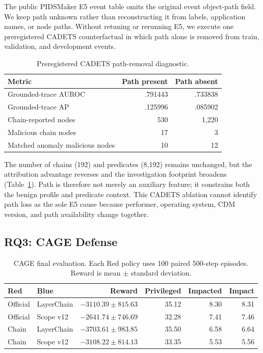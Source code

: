 \documentclass[runningheads]{llncs}
\begin{document}
The public PIDSMaker E5 event table omits the original event object-path field. We keep path unknown rather than reconstructing it from labels, application names, or node paths. Without retuning or rerunning E5, we execute one preregistered CADETS counterfactual in which path alone is removed from train, validation, and development events.

\begin{table}[t]
\caption{Preregistered CADETS path-removal diagnostic.}
\label{tab:path}
\centering
\small
\begin{tabular}{lrr}
\toprule
Metric & Path present & Path absent \\
\midrule
Grounded-trace AUROC & .791443 & .733838 \\
Grounded-trace AP & .125996 & .085902 \\
Chain-reported nodes & 530 & 1,220 \\
Malicious chain nodes & 17 & 3 \\
Matched anomaly malicious nodes & 10 & 12 \\
\bottomrule
\end{tabular}
\end{table}

The number of chains (192) and predicates (8,192) remains unchanged, but the attribution advantage reverses and the investigation footprint broadens (Table~\ref{tab:path}). Path is therefore not merely an auxiliary feature; it constrains both the benign profile and predicate context. This CADETS ablation cannot identify path loss as the sole E5 cause because performer, operating system, CDM version, and path availability change together.

\subsection{RQ3: CAGE Defense}

\begin{table}[t]
\caption{CAGE final evaluation. Each Red policy uses 100 paired 500-step episodes. Reward is mean $\pm$ standard deviation.}
\label{tab:cage}
\centering
\scriptsize
\setlength{\tabcolsep}{3.0pt}
\begin{tabular}{llrrrr}
\toprule
Red & Blue & Reward & Privileged & Impacted & Impact \\
\midrule
Official & LayerChain & $-3110.39\pm815.63$ & 35.12 & 8.30 & 8.31 \\
Official & Scope v12 & $-2641.74\pm746.69$ & 32.28 & 7.41 & 7.46 \\
Chain & LayerChain & $-3703.61\pm983.85$ & 35.50 & 6.58 & 6.64 \\
Chain & Scope v12 & $-3108.22\pm814.13$ & 33.35 & 5.53 & 5.56 \\
\bottomrule
\end{tabular}
\end{table}
\end{document}
